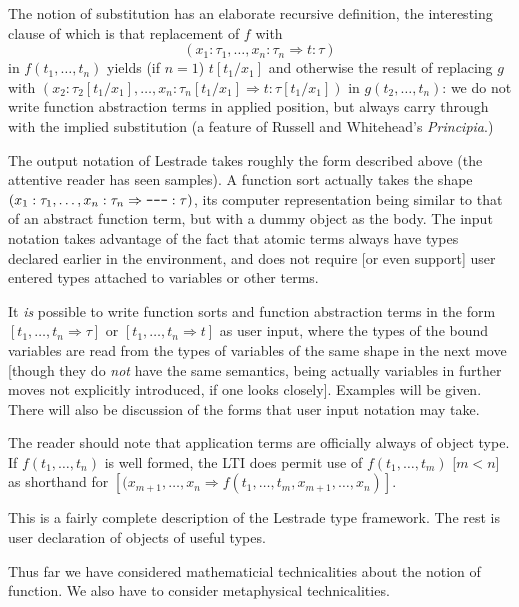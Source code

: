 \documentclass[12pt]{article}
\begin{document}
The notion of substitution has an elaborate recursive definition, the interesting clause of which is that replacement
of $f$ with $$(x_1:\tau_1,\ldots,x_n:\tau_n\Rightarrow t:\tau)$$ in $f(t_1,\ldots,t_n)$ yields (if $n=1$) $t[t_1/x_1]$
and otherwise the result of replacing $g$ with $(x_2:\tau_2[t_1/x_1],\ldots,x_n:\tau_n[t_1/x_1]\Rightarrow t:\tau[t_1/x_1])$
in $g(t_2,\ldots,t_n)$:  we do not write function abstraction terms in applied position, but always carry through with the implied substitution (a feature of Russell and Whitehead's {\em Principia\/}.)

The output notation of Lestrade takes roughly the form described above (the attentive reader has seen samples).   A function sort actually takes the shape $(x_1:\tau_1,\ldots,x_n:\tau_n\Rightarrow \verb|---|:\tau)$, its computer representation being similar to that of an abstract function term, but with a dummy object as the body.
The input notation takes advantage of the fact that atomic terms always have types declared earlier in the environment, and does not require [or even support] user entered types attached to variables or other terms.

It {\em is\/} possible to write function sorts and function abstraction terms in the form $[t_1,\ldots,t_n \Rightarrow \tau]$
or $[t_1,\ldots,t_n \Rightarrow t]$ as user input, where the types of the bound variables are read from the types of variables of the same shape in the next move [though they do {\em not\/} have the same semantics, being actually variables in further moves not explicitly introduced, if one looks closely].  Examples will be given.  There will also be discussion of the forms that
user input notation may take.

The reader should note that application terms are officially always of object type.  If $f(t_1,\ldots,t_n)$ is well formed, the LTI  does permit use of $f(t_1,\ldots,t_m)$ [$m<n$] as shorthand for $[(x_{m+1},\ldots,x_n\Rightarrow f(t_1,\ldots,t_m,x_{m+1},\ldots,x_n)]$.

This is a fairly complete description of the Lestrade type framework.  The rest is user declaration of objects of useful types.

Thus far we have considered mathematicial technicalities about the notion of function.  We also have to consider metaphysical technicalities.
\end{document}

